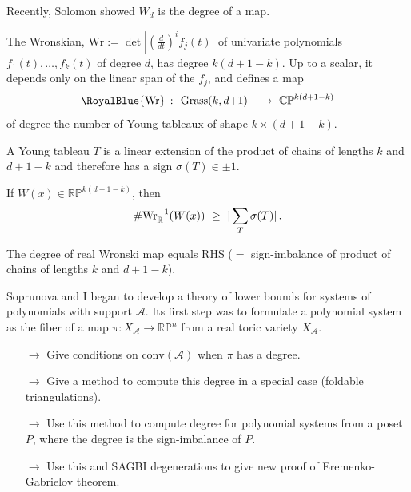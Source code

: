 \documentclass[17pt,landscape]{Narrow}
\newcommand{\DeCo}{\RoyalBlue}
\renewcommand{\P}{{\mathbb P}}
\newcommand{\C}{{\mathbb C}}
\newcommand{\R}{{\mathbb R}}
\newcommand{\calA}{{\mathcal A}}
\begin{document}
\begin{flushleft}
Recently, Solomon showed $W_d$ is the degree of a map.
\slide{}
\LogoOn
\begin{center}
\end{center}

The  Wronskian, $\mbox{Wr}:=\det|(\frac{d}{d t})^i f_j(t)|$ of
univariate polynomials $f_1(t),\dotsc,f_k(t)$ of degree $d$, has degree $k(d{+}1{-}k)$.
Up to a scalar, it depends only on the linear span of the $f_j$, and 
defines a map\vspace{-8pt}
\[
   \DeCo{\mbox{Wr}}\ \colon\ \mbox{Grass}(k,d{+}1) \ \longrightarrow\ \C\P^{k(d+1-k)}\vspace{-8pt}
\]
of degree the number of Young tableaux of shape $k\times(d{+}1{-}k)$.

A Young tableau $T$ is a linear extension of the product of chains of lengths $k$
and $d{+}1{-}k$ and therefore has a sign $\sigma(T)\in{\pm1}$.


If $W(x)\in\R\P^{k(d+1-k)}$, then \vspace{-8pt}
\[
   \# \mbox{Wr}_\R^{-1}(W(x))\ \geq\  |\sum_T \sigma(T)|\,.\vspace{-18pt}
\]

 The degree of real Wronski map equals RHS \newline ($=$ sign-imbalance of product of
chains of lengths $k$ and $d{+}1{-}k$). 
\slide{}
\LogoOn
\begin{center}
\end{center}

Soprunova and I began to develop a theory of lower bounds for systems of polynomials with
support $\calA$.  
Its first step was to formulate a polynomial system as the fiber of a map 
$\pi\colon X_\calA\to\R\P^n$ from a real toric variety $X_\calA$.\vspace{-4pt}

\begin{itemize}
 \item[$\to$] Give conditions on $\mbox{conv}(\calA)$ when $\pi$ has a degree.
 \item[$\to$] Give a method to compute this degree in a special case (foldable triangulations).
 \item[$\to$] Use this method to compute degree for polynomial systems from a poset $P$,
              where the degree is the sign-imbalance of $P$.
 \item[$\to$] Use this and SAGBI degenerations to give new proof of Eremenko-Gabrielov
              theorem.\vspace{-4pt} 
\end{itemize}


\end{flushleft}
\end{document}
